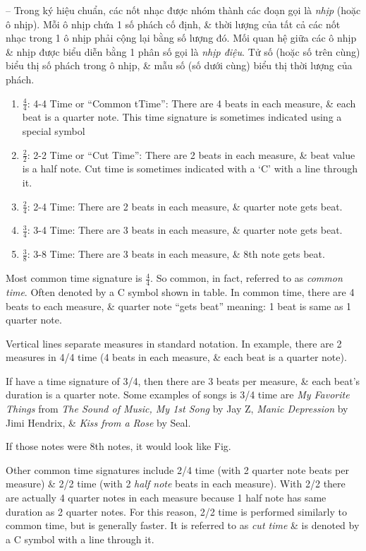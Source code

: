 \documentclass{article}
\begin{document}
\begin{itemize}
\begin{itemize}
		-- Trong ký hiệu chuẩn, các nốt nhạc được nhóm thành các đoạn gọi là {\it nhịp} (hoặc ô nhịp). Mỗi ô nhịp chứa 1 số phách cố định, \& thời lượng của tất cả các nốt nhạc trong 1 ô nhịp phải cộng lại bằng số lượng đó. Mối quan hệ giữa các ô nhịp \& nhịp được biểu diễn bằng 1 phân số gọi là {\it nhịp điệu}. Tử số (hoặc số trên cùng) biểu thị số phách trong ô nhịp, \& mẫu số (số dưới cùng) biểu thị thời lượng của phách.
		\begin{enumerate}
			\item $\frac{4}{4}$: 4-4 Time or ``Common tTime'': There are 4 beats in each measure, \& each beat is a quarter note. This time signature is sometimes indicated using a special symbol
			\item $\frac{2}{2}$: 2-2 Time or ``Cut Time'': There are 2 beats in each measure, \& beat value is a half note. Cut time is sometimes indicated with a `C' with a line through it.
			\item $\frac{2}{4}$: 2-4 Time: There are 2 beats in each measure, \& quarter note gets beat.
			\item $\frac{3}{4}$: 3-4 Time: There are 3 beats in each measure, \& quarter note gets beat.
			\item $\frac{3}{8}$: 3-8 Time: There are 3 beats in each measure, \& 8th note gets beat.
		\end{enumerate}
		Most common time signature is $\frac{4}{4}$. So common, in fact, referred to as {\it common time}. Often denoted by a C symbol shown in table. In common time, there are 4 beats to each measure, \& quarter note ``gets beat'' meaning: 1 beat is same as 1 quarter note.
		
		Vertical lines separate measures in standard notation. In example, there are 2 measures in 4/4 time (4 beats in each measure, \& each beat is a quarter note).
		
		If have a time signature of 3/4, then there are 3 beats per measure, \& each beat's duration is a quarter note. Some examples of songs is 3/4 time are {\it My Favorite Things} from {\it The Sound of Music, My 1st Song} by Jay Z, {\it Manic Depression} by {\sc Jimi Hendrix}, \& {\it Kiss from a Rose} by {\sc Seal}.
		
		If those notes were 8th notes, it would look like {\sf Fig.}
		
		Other common time signatures include 2/4 time (with 2 quarter note beats per measure) \& 2/2 time (with 2 {\it half note} beats in each measure). With 2/2 there are actually 4 quarter notes in each measure because 1 half note has same duration as 2 quarter notes. For this reason, 2/2 time is performed similarly to common time, but is generally faster. It is referred to as {\it cut time} \& is denoted by a C symbol with a line through it.
		

\end{itemize}
\end{itemize}
\end{document}

